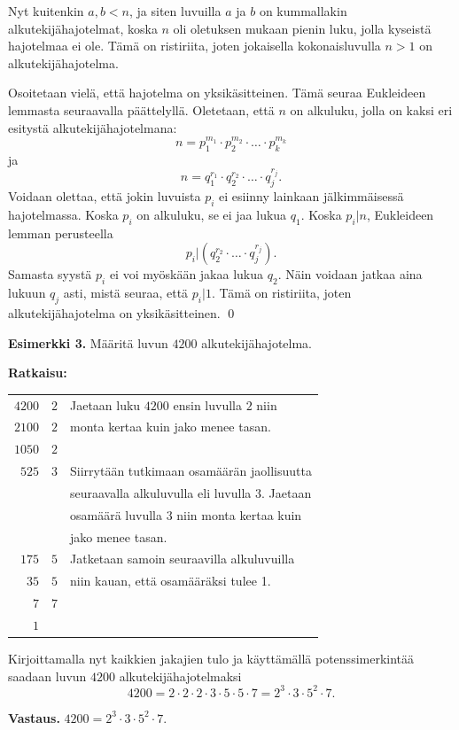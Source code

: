 Nyt kuitenkin $a,b<n$, ja siten luvuilla $a$ ja $b$ on kummallakin alkutekijähajotelmat, koska $n$ oli oletuksen mukaan pienin luku, jolla kyseistä hajotelmaa ei ole. Tämä on ristiriita, joten jokaisella kokonaisluvulla $n>1$ on alkutekijähajotelma.

Osoitetaan vielä, että hajotelma on yksikäsitteinen. Tämä seuraa Eukleideen lemmasta seuraavalla päättelyllä. Oletetaan, että $n$ on alkuluku, jolla on kaksi eri esitystä alkutekijähajotelmana:
\[
n= p_1^{m_1} \cdot p_2^{m_2} \cdot \ldots \cdot p_k^{m_k}
\]
ja
\[
n= q_1^{r_1} \cdot q_2^{r_2} \cdot \ldots \cdot q_j^{r_j}.
\]
Voidaan olettaa, että jokin luvuista $p_i$ ei esiinny lainkaan jälkimmäisessä hajotelmassa. Koska $p_i$ on alkuluku, se ei jaa lukua $q_1$. Koska $p_i|n$, Eukleideen lemman perusteella
\[
p_i | (q_2^{r_2} \cdot \ldots \cdot q_j^{r_j}).
\]
Samasta syystä $p_i$ ei voi myöskään jakaa lukua $q_2$. Näin voidaan jatkaa aina lukuun $q_j$ asti, mistä seuraa, että $p_i|1$. Tämä on ristiriita, joten alkutekijähajotelma on yksikäsitteinen.
\qed

{\bf Esimerkki 3.} Määritä luvun $4200$
alkutekijähajotelma.

{\bf Ratkaisu:}

\begin{tabular}{r|ll}
$4200$ & $2$ &
Jaetaan luku $4200$ ensin luvulla $2$ niin\\
$2100$ & $2$ &
monta kertaa kuin jako menee tasan.\\
$1050$ & $2$ & \\
$525$ & $3$ &
Siirrytään tutkimaan osamäärän jaollisuutta\\
& &
seuraavalla alkuluvulla eli luvulla $3$. Jaetaan\\
& &
osamäärä luvulla $3$ niin monta kertaa kuin\\
& &
jako menee tasan.\\
$175$ & $5$ &
Jatketaan samoin seuraavilla alkuluvuilla\\
$35$ & $5$ &
niin kauan, että osamääräksi tulee 1.\\
$7$ & $7$ & \\
$1$ & & \\
\end{tabular}

Kirjoittamalla nyt kaikkien jakajien tulo ja käyttämällä
potenssimerkintää saadaan luvun $4200$
alkutekijähajotelmaksi
\[
4200 = 2 \cdot 2 \cdot 2 \cdot 3 \cdot 5 \cdot 5 \cdot 7
= 2^3 \cdot 3 \cdot 5^2 \cdot 7.
\]

{\bf Vastaus.} $4200 =2^3\cdot 3 \cdot 5^2 \cdot 7$.

